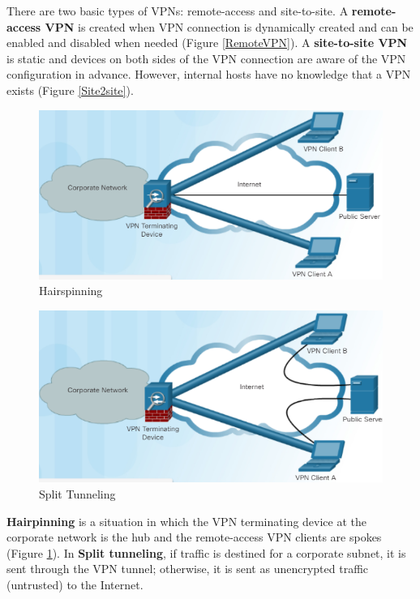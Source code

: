 There are two basic types of VPNs: remote-access and site-to-site. A \textbf{remote-access VPN} is created when VPN connection is dynamically created and can be enabled and disabled when needed (Figure \ref{RemoteVPN}). A \textbf{site-to-site VPN} is static and devices on both sides of the VPN connection are aware of the VPN configuration in advance. However, internal hosts have no knowledge that a VPN exists (Figure \ref{Site2site}).\\

\begin{figure}[hbtp]
\caption{Hairspinning}\label{Hairspinning}
\centering
\includegraphics[scale=0.5]{pictures/Hairspinning.PNG}
\end{figure}

\begin{figure}[hbtp]
\caption{Split Tunneling}
\centering
\includegraphics[scale=0.5]{pictures/SplitTunneling.PNG}
\end{figure}



\textbf{Hairpinning} is a situation in which the VPN terminating device at the corporate network is the hub and the remote-access VPN clients are spokes (Figure \ref{Hairspinning}). In \textbf{Split tunneling}, if traffic is destined for a corporate subnet, it is sent through the VPN tunnel; otherwise, it is sent as unencrypted traffic (untrusted) to the Internet.

